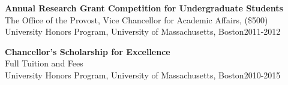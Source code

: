 \documentclass[letterpaper]{article}
\renewenvironment{itemize}{
  \begin{list}{}{
    \setlength{\leftmargin}{1.5em}
  }
}{
  \end{list}
}
\begin{document}
\begin{itemize}
\item \textbf{Annual Research Grant Competition for Undergraduate Students}\\
The Office of the Provost, Vice Chancellor for Academic Affairs, (\$500)\\
University Honors Program, University of Massachusetts, Boston\hfill 2011-2012

\item \textbf{Chancellor's Scholarship for Excellence}\\
Full Tuition and Fees\\
University Honors Program, University of Massachusetts, Boston\hfill 2010-2015

\end{itemize}
\end{document}
